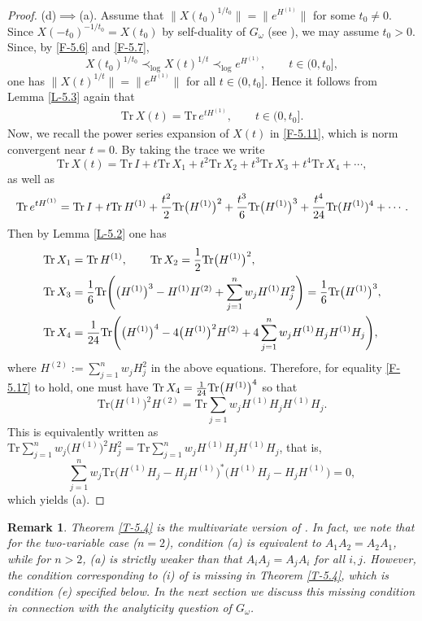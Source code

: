 \documentclass[11pt,reqno]{article}
\newtheorem{remark}[theorem]{Remark}
\numberwithin{equation}{section}
\def\Tr{\mathrm{Tr}}
\begin{document}
\begin{proof}
(d)$\implies$(a).\enspace
Assume that $\big\|X(t_0)^{1/t_0}\big\|=\big\|e^{H^{(1)}}\big\|$ for some $t_0\ne0$. Since $X(-t_0)^{-1/t_0}=X(t_0)$
by self-duality of $G_\omega$ (see \cite[p.\ 269]{LL1}), we may assume $t_0>0$. Since, by \eqref{F-5.6} and
\eqref{F-5.7},
\[
X(t_0)^{1/t_0}\prec_{\log}X(t)^{1/t}\prec_{\log}e^{H^{(1)}},\qquad t\in(0,t_0],
\]
one has $\|X(t)^{1/t}\|=\big\|e^{H^{(1)}}\big\|$ for all $t\in(0,t_0]$. Hence it follows from Lemma \ref{L-5.3} again
that
\begin{align}\label{F-5.17}
\Tr\,X(t)=\Tr\,e^{tH^{(1)}},\qquad t\in(0,t_0].
\end{align}
Now, we recall the power series expansion of $X(t)$ in \eqref{F-5.11}, which is norm convergent near $t=0$.
By taking the trace we write
\[
\Tr\,X(t)=\Tr\,I+t\Tr\,X_1+t^2\Tr\,X_2+t^3\Tr\,X_3+t^4\Tr\,X_4+\cdots,
\]
as well as
\[
\Tr\,e^{tH^{(1)}}=\Tr\,I+t\Tr\,H^{(1)}+{t^2\over2}\Tr\bigl(H^{(1)}\bigr)^2+{t^3\over6}\Tr\bigl(H^{(1)}\bigr)^3
+{t^4\over24}\Tr(H^{(1)})^4+\cdots.
\]
Then by Lemma \ref{L-5.2} one has
\begin{align*}
\Tr\,X_1&=\Tr\,H^{(1)},\qquad \Tr\,X_2={1\over2}\Tr\bigl(H^{(1)}\bigr)^2, \\
\Tr\,X_3&={1\over6}\Tr\Biggl(\bigl(H^{(1)}\bigr)^3-H^{(1)}H^{(2)}+\sum_{j=1}^nw_jH^{(1)}H_j^2\Biggr)
={1\over6}\Tr\bigl(H^{(1)}\bigr)^3, \\
\Tr\,X_4&={1\over24}\Tr\Biggl(\bigl(H^{(1)}\bigr)^4-4\bigl(H^{(1)}\bigr)^2H^{(2)}
+4\sum_{j=1}^nw_jH^{(1)}H_jH^{(1)}H_j\Biggr),
\end{align*}
where $H^{(2)}:=\sum_{j=1}^nw_jH_j^2$ in the above equations. Therefore, for equality \eqref{F-5.17} to
hold, one must have $\Tr\,X_4={1\over24}\Tr\bigl(H^{(1)}\bigr)^4$ so that
\[
\Tr\bigl(H^{(1)}\bigr)^2H^{(2)}=\Tr\sum_{j=1}w_jH^{(1)}H_jH^{(1)}H_j.
\]
This is equivalently written as
$\Tr\sum_{j=1}^nw_j\bigl(H^{(1)}\bigr)^2H_j^2=\Tr\sum_{j=1}^nw_jH^{(1)}H_jH^{(1)}H_j$, that is,
\[
\sum_{j=1}^nw_j\Tr\bigl(H^{(1)}H_j-H_jH^{(1)}\bigr)^*\bigl(H^{(1)}H_j-H_jH^{(1)}\bigr)=0,
\]
which yields (a).
\end{proof}

\begin{remark}\label{R-5.5}\rm
Theorem \ref{T-5.4} is the multivariate version of \cite[Theorem 2.1]{Hi}. In fact, we note that for the
two-variable case ($n=2$), condition (a) is equivalent to $A_1A_2=A_2A_1$, while for $n>2$, (a) is strictly
weaker than that $A_iA_j=A_jA_i$ for all $i,j$.  However, the condition corresponding to (i) of
\cite[Theorem 3.1]{Hi} is missing in Theorem \ref{T-5.4}, which is condition (e) specified below. In the next
section we discuss this missing condition in connection with the analyticity question of $G_\omega$.
\end{remark}
\end{document}
